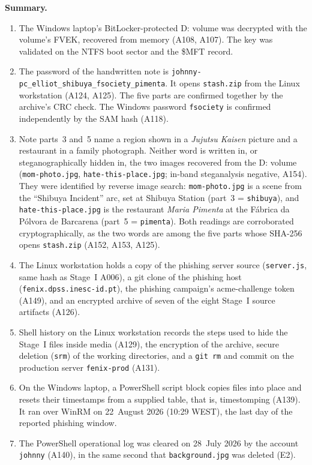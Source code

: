 \documentclass[11pt,a4paper,final,oneside]{article}
\begin{document}
\textbf{Summary.}
\begin{enumerate}
  \item The Windows laptop's BitLocker-protected D: volume was decrypted with the volume's FVEK, recovered from memory (A108, A107). The key was validated on the NTFS boot sector and the \$MFT record.
  \item The password of the handwritten note is \texttt{johnny-pc\_elliot\_shibuya\_fsociety\_pimenta}. It opens \texttt{stash.zip} from the Linux workstation (A124, A125). The five parts are confirmed together by the archive's CRC check. The Windows password \texttt{fsociety} is confirmed independently by the SAM hash (A118).
  \item Note parts~3 and~5 name a region shown in a \emph{Jujutsu Kaisen} picture and a restaurant in a family photograph. Neither word is written in, or steganographically hidden in, the two images recovered from the D: volume (\texttt{mom-photo.jpg}, \texttt{hate-this-place.jpg}; in-band steganalysis negative, A154). They were identified by reverse image search: \texttt{mom-photo.jpg} is a scene from the ``Shibuya Incident'' arc, set at Shibuya Station (part~3 = \texttt{shibuya}), and \texttt{hate-this-place.jpg} is the restaurant \emph{Maria Pimenta} at the Fábrica da Pólvora de Barcarena (part~5 = \texttt{pimenta}). Both readings are corroborated cryptographically, as the two words are among the five parts whose SHA-256 opens \texttt{stash.zip} (A152, A153, A125).
  \item The Linux workstation holds a copy of the phishing server source (\texttt{server.js}, same hash as Stage~I A006), a git clone of the phishing host (\texttt{fenix.dpss.inesc-id.pt}), the phishing campaign's acme-challenge token (A149), and an encrypted archive of seven of the eight Stage~I source artifacts (A126).
  \item Shell history on the Linux workstation records the steps used to hide the Stage~I files inside media (A129), the encryption of the archive, secure deletion (\texttt{srm}) of the working directories, and a \texttt{git rm} and commit on the production server \texttt{fenix-prod} (A131).
  \item On the Windows laptop, a PowerShell script block copies files into place and resets their timestamps from a supplied table, that is, timestomping (A139). It ran over WinRM on 22~August 2026 (10:29 WEST), the last day of the reported phishing window.
  \item The PowerShell operational log was cleared on 28~July 2026 by the account \texttt{johnny} (A140), in the same second that \texttt{background.jpg} was deleted (E2).
\end{enumerate}
\end{document}
